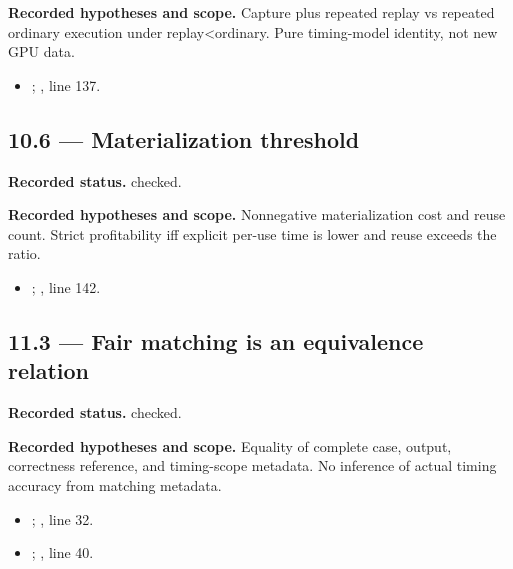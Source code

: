 \textbf{Recorded hypotheses and scope.} Capture plus repeated replay vs repeated ordinary execution under replay<ordinary. Pure timing-model identity, not new GPU data.

\begin{itemize}
\item {}; , line 137.
\end{itemize}
\subsection{10.6 — Materialization threshold}
\label{result:10.6}
\textbf{Recorded status.} checked.

\textbf{Recorded hypotheses and scope.} Nonnegative materialization cost and reuse count. Strict profitability iff explicit per-use time is lower and reuse exceeds the ratio.

\begin{itemize}
\item {}; , line 142.
\end{itemize}
\subsection{11.3 — Fair matching is an equivalence relation}
\label{result:11.3}
\textbf{Recorded status.} checked.

\textbf{Recorded hypotheses and scope.} Equality of complete case, output, correctness reference, and timing-scope metadata. No inference of actual timing accuracy from matching metadata.

\begin{itemize}
\item {}; , line 32.
\item {}; , line 40.
\end{itemize}
